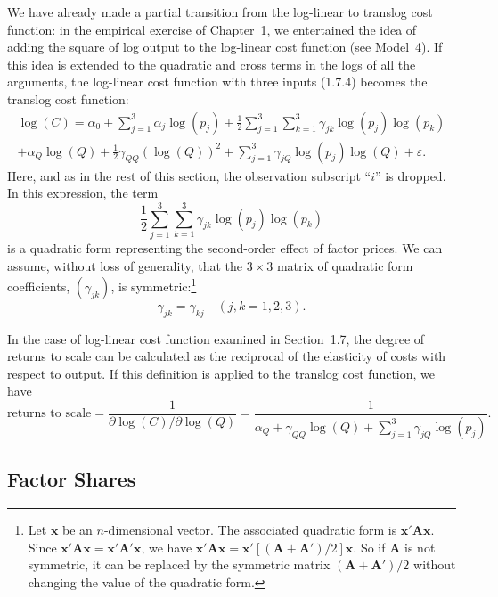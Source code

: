 We have already made a partial transition from the log-linear to translog cost function:
in the empirical exercise of Chapter~1, we entertained the idea of adding the
square of log output to the log-linear cost function (see Model~4). If this idea is
extended to the quadratic and cross terms in the logs of all the arguments, the log-linear
cost function with three inputs (1.7.4) becomes the translog cost function:
\begin{multline}
\log(C) = \alpha_0 + \sum_{j=1}^{3} \alpha_j \log(p_j)
+ \frac{1}{2} \sum_{j=1}^{3} \sum_{k=1}^{3}
\gamma_{jk} \log(p_j) \log(p_k) \\
+ \alpha_Q \log(Q) + \frac{1}{2} \gamma_{QQ} (\log(Q))^2
+ \sum_{j=1}^{3} \gamma_{jQ} \log(p_j) \log(Q) + \varepsilon.
\label{eq:4.7.1}
\end{multline}
Here, and as in the rest of this section, the observation subscript ``$i$'' is dropped.
In this expression, the term
\[
\frac{1}{2} \sum_{j=1}^{3} \sum_{k=1}^{3}
\gamma_{jk} \log(p_j) \log(p_k)
\]
is a quadratic form representing the second-order effect of factor prices. We can
assume, without loss of generality, that the $3 \times 3$ matrix of quadratic form
coefficients, $(\gamma_{jk})$, is symmetric:\footnote{Let $\mathbf{x}$ be an
$n$-dimensional vector. The associated quadratic form is $\mathbf{x}'\mathbf{A}\mathbf{x}$.
Since $\mathbf{x}'\mathbf{A}\mathbf{x} = \mathbf{x}'\mathbf{A}'\mathbf{x}$, we have
$\mathbf{x}'\mathbf{A}\mathbf{x} = \mathbf{x}'[(\mathbf{A} + \mathbf{A}')/2]\mathbf{x}$.
So if $\mathbf{A}$ is not symmetric, it can be replaced by the symmetric matrix
$(\mathbf{A} + \mathbf{A}')/2$ without changing the value of the quadratic form.}
\begin{equation}
\gamma_{jk} = \gamma_{kj} \quad (j, k = 1, 2, 3).
\label{eq:4.7.2}
\end{equation}

In the case of log-linear cost function examined in Section~1.7, the degree of
returns to scale can be calculated as the reciprocal of the elasticity of costs with
respect to output. If this definition is applied to the translog cost function, we have
\begin{equation}
\text{returns to scale} = \frac{1}{\partial \log(C) / \partial \log(Q)}
= \frac{1}{\alpha_Q + \gamma_{QQ} \log(Q)
+ \sum_{j=1}^{3} \gamma_{jQ} \log(p_j)}.
\label{eq:4.7.3}
\end{equation}

\subsection*{Factor Shares}

